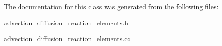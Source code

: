 The documentation for this class was generated from the following files\+:\begin{DoxyCompactItemize}
\item 
\hyperlink{advection__diffusion__reaction__elements_8h}{advection\+\_\+diffusion\+\_\+reaction\+\_\+elements.\+h}\item 
\hyperlink{advection__diffusion__reaction__elements_8cc}{advection\+\_\+diffusion\+\_\+reaction\+\_\+elements.\+cc}\end{DoxyCompactItemize}
